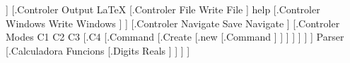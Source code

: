 \documentclass[border=2]{standalone}
\begin{document}
\Tree [.Main [.{Controler Central}
%
	[.Altres
		[.{Controler Input}
			[.{Controler Key} {Read Key} ]
			[.{Controler File} {Read File} ]
		]
%
		[.{Controler Output}
			{\LaTeX}
			[.{Controler File} {Write File} ]
			help
			[.{Controler Windows} {Write Windows} ]
		]
%
		[.{Controler Navigate}
			{Save Navigate}
		]
%
		[.{Controler Modes}
			C1
			C2
			C3
			[.C4 [.Command [.Create [.new [.Command ] ] ] ] ]
		]
	]
	Parser
	[.Calculadora
		Funcions
		[.Digits Reals ]
	]
] ]
\end{document}
